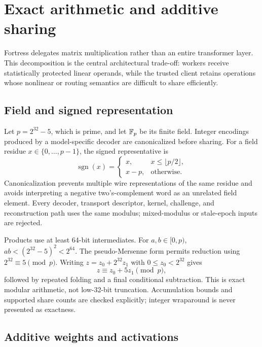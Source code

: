\section{Exact arithmetic and additive sharing}\label{sec:arithmetic}

Fortress delegates matrix multiplication rather than an entire transformer layer. This decomposition is the central architectural trade-off: workers receive statistically protected linear operands, while the trusted client retains operations whose nonlinear or routing semantics are difficult to share efficiently.

\subsection{Field and signed representation}

Let $p=2^{32}-5$, which is prime, and let $\mathbb{F}_{p}$ be its finite field. Integer encodings produced by a model-specific decoder are canonicalized before sharing. For a field residue $x\in\{0,\ldots,p-1\}$, the signed representative is
\begin{equation}
\operatorname{sgn}(x)=
\begin{cases}
x, & x\leq\lfloor p/2\rfloor,\\
x-p, & \text{otherwise}.
\end{cases}
\label{eq:signed}
\end{equation}
Canonicalization prevents multiple wire representations of the same residue and avoids interpreting a negative two's-complement word as an unrelated field element. Every decoder, transport descriptor, kernel, challenge, and reconstruction path uses the same modulus; mixed-modulus or stale-epoch inputs are rejected.

Products use at least 64-bit intermediates. For $a,b\in[0,p)$, $ab<(2^{32}-5)^2<2^{64}$. The pseudo-Mersenne form permits reduction using $2^{32}\equiv5\pmod p$. Writing $z=z_0+2^{32}z_1$ with $0\leq z_0<2^{32}$ gives
\begin{equation}
z\equiv z_0+5z_1\pmod p,
\end{equation}
followed by repeated folding and a final conditional subtraction. This is exact modular arithmetic, not low-32-bit truncation. Accumulation bounds and supported share counts are checked explicitly; integer wraparound is never presented as exactness.

\subsection{Additive weights and activations}

